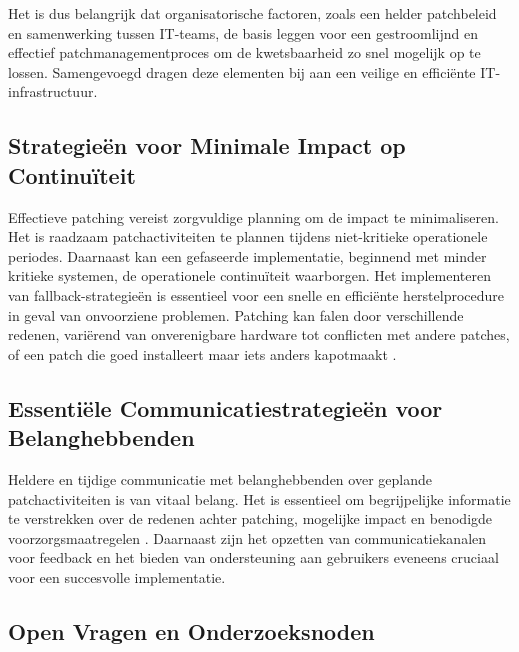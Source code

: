 Het is dus belangrijk dat organisatorische factoren, zoals een helder patchbeleid en samenwerking tussen IT-teams, de basis leggen voor een gestroomlijnd en effectief patchmanagementproces om de kwetsbaarheid zo snel mogelijk op te lossen. Samengevoegd dragen deze elementen bij aan een veilige en efficiënte IT-infrastructuur.

\subsection{ Strategieën voor Minimale Impact op Continuïteit}

Effectieve patching vereist zorgvuldige planning om de impact te minimaliseren. Het is raadzaam patchactiviteiten te plannen tijdens niet-kritieke operationele periodes. Daarnaast kan een gefaseerde implementatie, beginnend met minder kritieke systemen, de operationele continuïteit waarborgen. Het implementeren van fallback-strategieën is essentieel voor een snelle en efficiënte herstelprocedure in geval van onvoorziene problemen. Patching kan falen door verschillende redenen, variërend van onverenigbare hardware tot conflicten met andere patches, of een patch die goed installeert maar iets anders kapotmaakt \autocite{Shein2022}.

\subsection{ Essentiële Communicatiestrategieën voor Belanghebbenden}
Heldere en tijdige communicatie met belanghebbenden over geplande patchactiviteiten is van vitaal belang. Het is essentieel om begrijpelijke informatie te verstrekken over de redenen achter patching, mogelijke impact en benodigde voorzorgsmaatregelen \autocite{Toren2019}. Daarnaast zijn het opzetten van communicatiekanalen voor feedback en het bieden van ondersteuning aan gebruikers eveneens cruciaal voor een succesvolle implementatie.


\subsection{Open Vragen en Onderzoeksnoden}

